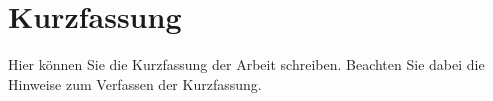 \chapter*{Kurzfassung}

Hier können Sie die Kurzfassung der Arbeit schreiben. Beachten Sie dabei die Hinweise zum Verfassen der Kurzfassung.
